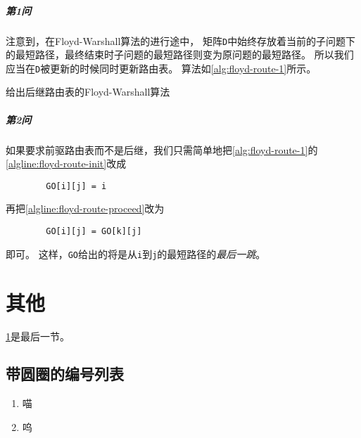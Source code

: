 \documentclass{dreamClass}
\begin{document}
\subparagraph*{第1问}
注意到，在Floyd-Warshall算法的进行途中，
矩阵\texttt{D}中始终存放着当前的子问题下的最短路径，最终结束时子问题的最短路径则变为原问题的最短路径。
所以我们应当在\texttt{D}被更新的时候同时更新路由表。
算法如\cref{alg:floyd-route-1}所示。

\begin{algorithm}
    \caption{给出后继路由表的Floyd-Warshall算法}\label{alg:floyd-route-1}
    \Indm
    \Indp

     {
         {
             {
            }
        }
    }
\end{algorithm}
\subparagraph*{第2问}
如果要求前驱路由表而不是后继，我们只需简单地把\cref{alg:floyd-route-1}的\cref{algline:floyd-route-init}改成
\begin{listing}[H]
    \begin{verbatim}
        GO[i][j] = i
    \end{verbatim}
\end{listing}
再把\cref{algline:floyd-route-proceed}改为
\begin{listing}[H]
    \begin{verbatim}
        GO[i][j] = GO[k][j]
    \end{verbatim}
\end{listing}
即可。
这样，\texttt{GO}给出的将是从\texttt{i}到\texttt{j}的最短路径的\emph{最后一跳}。

\section{其他}\label{sec:other}
\cref{sec:other}是最后一节。
\subsection{带圆圈的编号列表}
\begin{enumerate}[label=\large\protect\textcircled{\small\arabic*}]
    \item 喵
    \item 呜
\end{enumerate}
\end{document}
